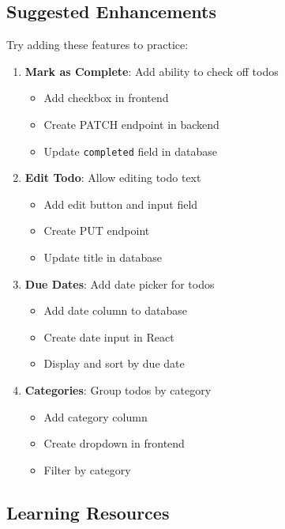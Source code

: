 \documentclass[12pt,a4paper]{article}
\begin{document}
\subsection{Suggested Enhancements}

Try adding these features to practice:

\begin{enumerate}
    \item \textbf{Mark as Complete}: Add ability to check off todos
    \begin{itemize}
        \item Add checkbox in frontend
        \item Create PATCH endpoint in backend
        \item Update \texttt{completed} field in database
    \end{itemize}
    
    \item \textbf{Edit Todo}: Allow editing todo text
    \begin{itemize}
        \item Add edit button and input field
        \item Create PUT endpoint
        \item Update title in database
    \end{itemize}
    
    \item \textbf{Due Dates}: Add date picker for todos
    \begin{itemize}
        \item Add date column to database
        \item Create date input in React
        \item Display and sort by due date
    \end{itemize}
    
    \item \textbf{Categories}: Group todos by category
    \begin{itemize}
        \item Add category column
        \item Create dropdown in frontend
        \item Filter by category
    \end{itemize}
\end{enumerate}

\subsection{Learning Resources}
\end{document}
